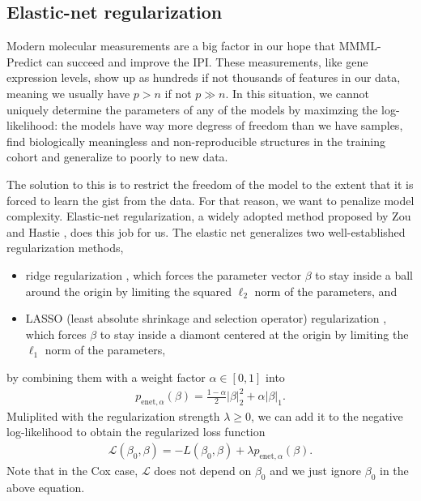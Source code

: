 \subsection{Elastic-net regularization} \label{subsec:elastic-net}

Modern molecular measurements are a big factor in our hope that MMML-Predict can succeed and improve 
the IPI. These measurements, like gene expression levels, show up as hundreds if not thousands of 
features in our data, meaning we usually have $p > n$ if not $p \gg n$. In this situation, we 
cannot uniquely determine the parameters of any of the models by maximzing the log-likelihood: 
the models have way more degress of freedom than we have samples, find biologically meaningless 
and non-reproducible structures in the training cohort and generalize to poorly to new data.

The solution to this is to restrict the freedom of the model to the extent that it is forced to 
learn the gist from the data. For that reason, we want to penalize model complexity. Elastic-net 
regularization, a widely adopted method proposed by Zou and Hastie \cite{elasticnet05}, does this 
job for us. The elastic net generalizes two well-established regularization methods,
\begin{itemize}
    \item ridge regularization \cite{ridge70}, which forces the parameter vector $\beta$ to 
        stay inside a ball around the origin by limiting the squared $\ell_2$ norm 
        of the parameters, and 
    \item LASSO (least absolute shrinkage and selection operator) regularization \cite{lasso18}, 
        which forces $\beta$ to stay inside a diamont centered at the origin by limiting the 
        $\ell_1$ norm of the parameters,
\end{itemize}
by combining them with a weight factor $\alpha \in [0, 1]$ into 
\begin{align}
    p_{\text{enet}, \alpha}(\beta) = \frac{1-\alpha}{2} |\beta|_2^2 + \alpha |\beta|_1.
\end{align}
Muliplited with the regularization strength $\lambda \geq 0$, we can add it to the negative 
log-likelihood to obtain the regularized loss function
\begin{align}
    \mathcal{L}(\beta_0, \beta) = -L(\beta_0, \beta) + \lambda p_{\text{enet}, \alpha}(\beta).
\end{align}
Note that in the Cox case, $\mathcal{L}$ does not depend on $\beta_0$ and we just ignore $\beta_0$ 
in the above equation. 

